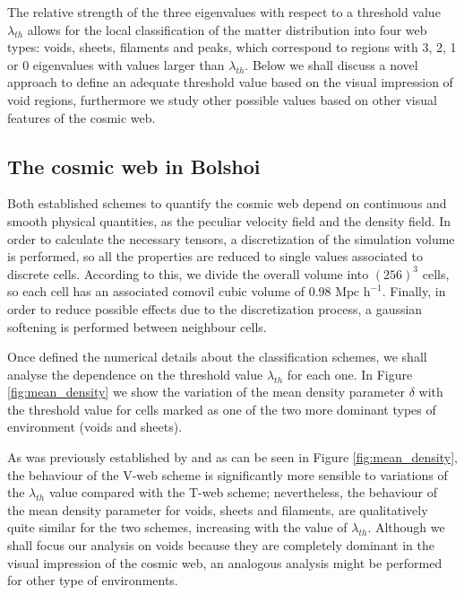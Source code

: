 \documentclass[usenatbib]{latex/mn2e}
\begin{document}
The relative strength of the three eigenvalues with respect to a threshold
value $\lambda_{th}$ allows for the local classification of the matter 
distribution into four web types: voids, sheets, filaments and peaks, 
which correspond to regions with 3, 2, 1 or 0 eigenvalues with values 
larger than $\lambda_{th}$. Below we shall discuss a novel approach to 
define an adequate threshold value based on the visual impression of void
regions, furthermore we study other possible values based on other visual
features of the cosmic web.



\subsection{The cosmic web in Bolshoi}
\label{subsec:web_in_simulations}



Both established schemes to quantify the cosmic web depend on continuous 
and smooth physical quantities, as the peculiar velocity field and the 
density field. In order to calculate the necessary tensors, a discretization
of the simulation volume is performed, so all the properties are reduced 
to single values associated to discrete cells. According to this, we divide 
the overall volume into $(256)^3$ cells, so each cell has an associated 
comovil cubic volume of $0.98 \mbox{ Mpc h}^{-1}$. Finally, in order to 
reduce possible effects due to the discretization process, a gaussian 
softening is performed between neighbour cells.



Once defined the numerical details about the classification schemes, we 
shall analyse the dependence on the threshold value $\lambda_{th}$ for each 
one. In Figure \ref{fig:mean_density} we show the variation of the mean 
density parameter $\delta$ with the threshold value for cells marked as one 
of the two more dominant types of environment (voids and sheets).



As was previously established by  and as 
can be seen in Figure \ref{fig:mean_density}, the behaviour of the 
V-web scheme is significantly more sensible to variations of the 
$\lambda_{th}$ value compared with the T-web scheme; nevertheless, the 
behaviour of the mean density parameter for voids, sheets and filaments, 
are qualitatively quite similar for the two schemes, increasing with the 
value of $\lambda_{th}$. Although we shall focus our analysis on voids 
because they are completely dominant in the visual impression of the 
cosmic web, an analogous analysis might be performed for other type of 
environments.
\end{document}
